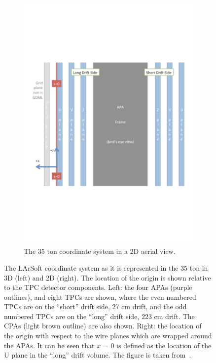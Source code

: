\begin{figure}
\begin{subfigure}{0.48\textwidth}
    \includegraphics[width=\textwidth]{35ton_xCenter}
    \caption{The 35 ton coordinate system in a 2D aerial view.}
  \end{subfigure}
  \caption[The LArSoft coordinate system as it is represented in the 35 ton.]
          {The LArSoft coordinate system as it is represented in the 35 ton in 3D (left) and 2D (right). The location of the origin is shown relative to the TPC detector components. Left: the four APAs (purple outlines), and eight TPCs are shown, where the even numbered TPCs are on the ``short'' drift side, 27 cm drift, and the odd numbered TPCs are on the ``long'' drift side, 223 cm drift. The CPAs (light brown outline) are also shown. Right: the location of the origin with respect to the wire planes which are wrapped around the APAs. It can be seen that $x$ = 0 is defined as the location of the U plane in the ``long'' drift volume. The figure is taken from~\citep{35tonGeomPage}.}
  \label{fig:LArSoft_coords}
\end{figure}

